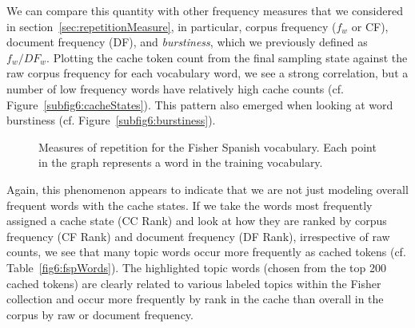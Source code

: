 We can compare this quantity with other frequency measures that we considered in section~\ref{sec:repetitionMeasure}, in particular, corpus frequency ($f_w$ or CF), document frequency (DF), and \textit{burstiness}, which we previously defined as $f_w/DF_w$.  Plotting the cache token count from the final sampling state against the raw corpus frequency for each vocabulary word, we see a strong correlation, but a number of low frequency words have relatively high cache counts (cf. Figure~\ref{subfig6:cacheStates}).  This pattern also emerged when looking at word burstiness (cf. Figure~\ref{subfig6:burstiness}).    

\begin{figure}
\begin{center}
\hfill
{}
\end{center}
\caption[Measures of repetition for Spanish Words]{Measures of repetition for the Fisher Spanish vocabulary. Each point in the graph represents a word in the training vocabulary. \label{fig6:repSpanish}}
\end{figure}

Again, this phenomenon appears to indicate that we are not just modeling overall frequent words with the cache states.  If we take the words most frequently assigned a cache state (CC Rank) and look at how they are ranked by corpus frequency (CF Rank) and document frequency (DF Rank), irrespective of raw counts, we see that many topic words occur more frequently as cached tokens (cf. Table~\ref{fig6:fspWords}).  The highlighted topic words (chosen from the top 200 cached tokens) are clearly related to various labeled topics within the Fisher collection and occur more frequently by rank in the cache than overall in the corpus by raw or document frequency.

